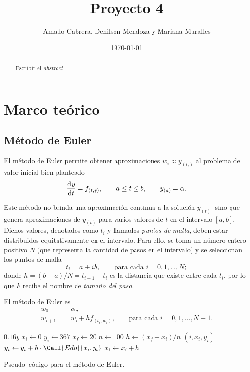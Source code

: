 \documentclass[english,spanish,Ce-table,Ce-theorem]{CabesHW}
\institute{Escuela de Ciencias Físicas y Matemática}
\title{Proyecto 4}
\author{Amado Cabrera, Denilson Mendoza y Mariana Muralles}
\date{\today}
\begin{document}
\maketitle

\begin{abstract}
Escribir el \textit{abstract}
\end{abstract}

\section{Marco teórico}
\subsection{Método de Euler}
El método de Euler permite obtener aproximaciones $w_i \approx y_{(t_i)}$ al problema de valor inicial bien planteado
\[ \td{y}{t} = f_{(t,y)}, \qquad a \leq t \leq b, \qquad y_{(a)} = \alpha. \]

Este método no brinda una aproximación continua a la solución $y_{(t)}$, sino que genera aproximaciones de $y_{(t)}$ para varios valores de $t$ en el intervalo $[a, b]$. Dichos valores, denotados como $t_i$ y llamados \textit{puntos de malla}, deben estar distribuidos equitativamente en el intervalo. Para ello, se toma un número entero positivo $N$ (que representa la cantidad de pasos en el intervalo) y se seleccionan los puntos de malla
\[ t_i = a + ih, \qquad \text{para cada $i = 0, 1, \ldots, N$}; \]
donde $h = (b-a)/N = t_{i+1} - t_i$ es la distancia que existe entre cada $t_i$, por lo que $h$ recibe el nombre de \textit{tamaño del paso}.


El método de Euler es
\begin{align*}
    w_0 &= \alpha.,\\
    w_{i+1} &= w_i + h f_{(t_i, w_i)}, \qquad \text{para cada $i = 0, 1, \ldots, N-1$}.
\end{align*}


\begin{algorithm}[H]
    \centering
    \begin{myalg}[1]
        \State \Output $0.16 y$
    \EndFunction
    \State \phantom{}
    \State $x_i \gets 0$ 
    \State $y_i \gets 367$ 
    \State $x_f \gets 20$ 
    \State $n \gets 100$ 
    \State \phantom{}
    \State $h \gets (x_f - x_i)/n$ 
        \State \Output $(i, x_i, y_i)$
        \State \phantom{}
        \State $y_i \gets y_i + h\cdot\Call{Edo}{x_i, y_i}$
        \State $x_i \gets x_i + h$
    \EndFor
    \end{myalg}
    \caption{Pseudo--código para el método de Euler.}
    \label{alg:euler}
\end{algorithm}
\end{document}
